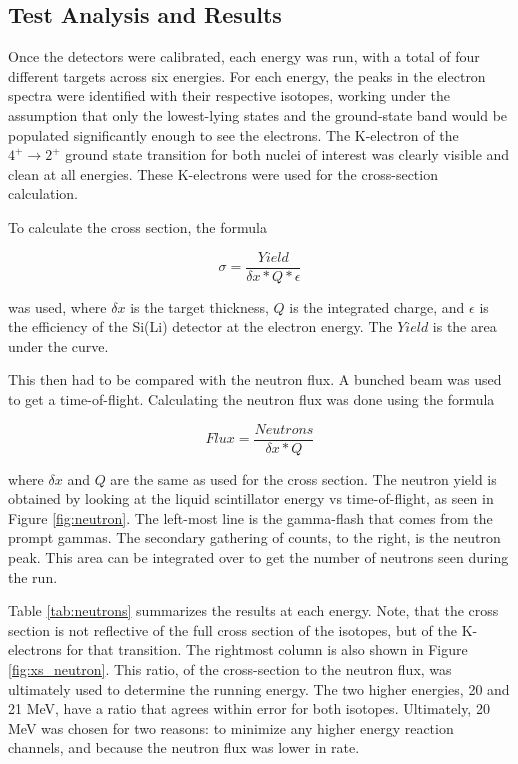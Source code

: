 \subsection{Test Analysis and Results}

Once the detectors were calibrated, each energy was run, with a total of four different targets across six energies. For each energy, the peaks in the electron spectra were identified with their respective isotopes, working under the assumption that only the lowest-lying states and the ground-state band would be populated significantly enough to see the electrons. The K-electron of the $4^+\rightarrow2^+$ ground state transition for both nuclei of interest was clearly visible and clean at all energies. These K-electrons were used for the cross-section calculation.

To calculate the cross section, the formula

\begin{equation}
    \sigma=\frac{Yield}{\delta x*Q*\epsilon}
    \label{eq:xs}
\end{equation}

was used, where $\delta x$ is the target thickness, $Q$ is the integrated charge, and $\epsilon$ is the efficiency of the Si(Li) detector at the electron energy. The $Yield$ is the area under the curve.

This then had to be compared with the neutron flux. A bunched beam was used to get a time-of-flight. Calculating the neutron flux was done using the formula

\begin{equation}
    Flux = \frac{Neutrons}{\delta x*Q}
\end{equation}

where $\delta x$ and $Q$ are the same as used for the cross section. The neutron yield is obtained by looking at the liquid scintillator energy vs time-of-flight, as seen in Figure \ref{fig:neutron}. The left-most line is the gamma-flash that comes from the prompt gammas. The secondary gathering of counts, to the right, is the neutron peak. This area can be integrated over to get the number of neutrons seen during the run.

Table \ref{tab:neutrons} summarizes the results at each energy. Note, that the cross section is not reflective of the full cross section of the isotopes, but of the K-electrons for that transition. The rightmost column is also shown in Figure \ref{fig:xs_neutron}. This ratio, of the cross-section to the neutron flux, was ultimately used to determine the running energy. The two higher energies, 20 and 21 MeV, have a ratio that agrees within error for both isotopes. Ultimately, 20 MeV was chosen for two reasons: to minimize any higher energy reaction channels, and because the neutron flux was lower in rate.



%
% 
% 
